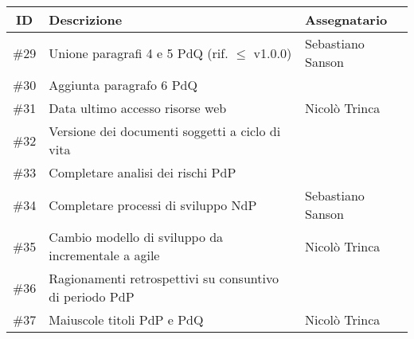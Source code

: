 \begin{center}
    \begin{tabular}{c|l|l}
        \rowcolor{pari_alt}
        \textbf{ID} & \textbf{Descrizione} & \textbf{Assegnatario} \\
        \midrule
        \#29 & Unione paragrafi 4 e 5 PdQ (rif. $\leq$ v1.0.0) & Sebastiano Sanson \\
        \#30 & Aggiunta paragrafo 6 PdQ & \\
        \#31 & Data ultimo accesso risorse web & Nicolò Trinca \\
        \#32 & Versione dei documenti soggetti a ciclo di vita & \\
        \#33 & Completare analisi dei rischi PdP &  \\
        \#34 & Completare processi di sviluppo NdP & Sebastiano Sanson \\
        \#35 & Cambio modello di sviluppo da incrementale a agile & Nicolò Trinca \\
        \#36 & Ragionamenti retrospettivi su consuntivo di periodo PdP & \\
        \#37 & Maiuscole titoli PdP e PdQ & Nicolò Trinca \\ 
    \end{tabular}
\end{center}